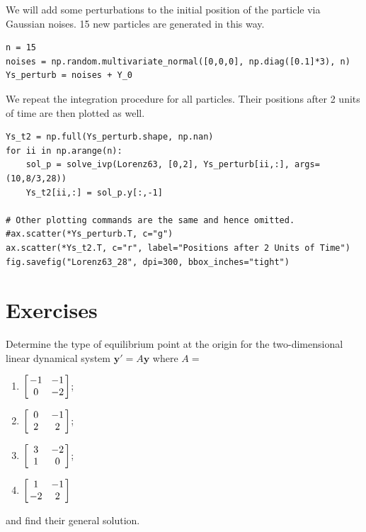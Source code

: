 We will add some perturbations to the initial position of the particle via Gaussian noises. 15 new particles are generated in this way.
\begin{lstlisting}
n = 15
noises = np.random.multivariate_normal([0,0,0], np.diag([0.1]*3), n)
Ys_perturb = noises + Y_0    
\end{lstlisting}
We repeat the integration procedure for all particles. Their positions after 2 units of time are then plotted as well.
\begin{lstlisting}
Ys_t2 = np.full(Ys_perturb.shape, np.nan)
for ii in np.arange(n):
    sol_p = solve_ivp(Lorenz63, [0,2], Ys_perturb[ii,:], args=(10,8/3,28))
    Ys_t2[ii,:] = sol_p.y[:,-1]
    
# Other plotting commands are the same and hence omitted.
#ax.scatter(*Ys_perturb.T, c="g")
ax.scatter(*Ys_t2.T, c="r", label="Positions after 2 Units of Time")
fig.savefig("Lorenz63_28", dpi=300, bbox_inches="tight")
\end{lstlisting}

\section{Exercises}

\begin{Exercise}
Determine the type of equilibrium point at the origin for the two-dimensional linear dynamical system $\textbf{y}' = A\textbf{y}$ where $A =$
\begin{enumerate}[label=(\alph*)]
    \item $\left[\begin{array}{@{\,}wc{12pt}wc{12pt}@{\,}}
    -1&-1\\ 
    0&-2
    \end{array}\right]$;
    \item $\left[\begin{array}{@{\,}wc{12pt}wc{12pt}@{\,}}
    0&-1\\ 
    2&2
    \end{array}\right]$;
    \item $\left[\begin{array}{@{\,}wc{12pt}wc{12pt}@{\,}}
    3&-2\\ 
    1&0
    \end{array}\right]$;
    \item $\left[\begin{array}{@{\,}wc{12pt}wc{12pt}@{\,}}
    1&-1\\ 
    -2&2
    \end{array}\right]$
\end{enumerate}
and find their general solution.
\end{Exercise}

